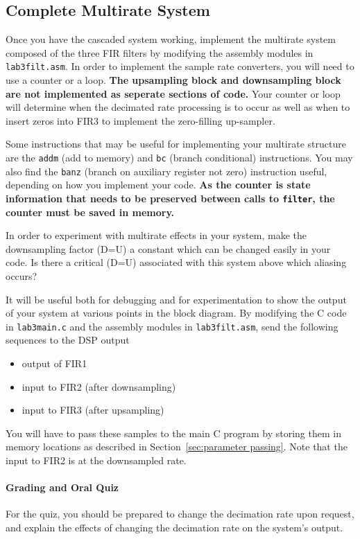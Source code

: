 \subsection{Complete Multirate System}

Once you have the cascaded system working, implement the multirate 
system composed of the three FIR filters by modifying the 
assembly modules in \verb+lab3filt.asm+.  In order to implement the 
sample rate converters, you will need to use a counter or a loop.  
{\bf The upsampling block and downsampling block are not implemented 
as seperate sections of code. }  Your counter or loop
will determine when the decimated rate processing is to occur
as well as when to insert zeros into FIR3 to implement the
zero-filling up-sampler. 

Some instructions that may be useful for implementing your
multirate structure are the \verb+addm+ (add to memory)
and \verb+bc+ (branch conditional) instructions. You may
also find the \verb+banz+ (branch on auxiliary register
not zero) instruction useful, depending on how you implement 
your code.  {\bf As the counter is state information that needs to 
be preserved between calls to \verb+filter+, the counter must be 
saved in memory.}

In order to experiment with multirate effects in your system, 
make the downsampling factor (D=U) a constant which can be changed 
easily in your code.  Is there a critical (D=U) associated with this 
system above which aliasing occurs?

It will be useful both for debugging and for experimentation to show 
the output of your system at various points in the block diagram.  
By modifying the C code in \verb+lab3main.c+ and the assembly 
modules in \verb+lab3filt.asm+, send the following sequences to the 
DSP output
\begin{itemize}
   \item{output of FIR1}
   \item{input to FIR2 (after downsampling)}
   \item{input to FIR3 (after upsampling)}
\end{itemize}
You will have to pass these samples to the main C program by storing 
them in memory locations as described in Section~\ref{sec:parameter
passing}.  Note that the input to FIR2 is at the downsampled 
rate.

\paragraph{Grading and Oral Quiz}
For the quiz, you should be prepared to change the decimation
rate upon request, and explain the effects of changing
the decimation rate on the system's output.

